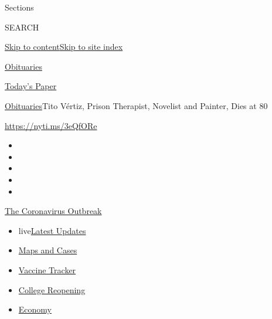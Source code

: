 Sections

SEARCH

\protect\hyperlink{site-content}{Skip to
content}\protect\hyperlink{site-index}{Skip to site index}

\href{https://www.nytimes.com/section/obituaries}{Obituaries}

\href{https://myaccount.nytimes.com/auth/login?response_type=cookie\&client_id=vi}{}

\href{https://www.nytimes.com/section/todayspaper}{Today's Paper}

\href{/section/obituaries}{Obituaries}\textbar{}Tito Vértiz, Prison
Therapist, Novelist and Painter, Dies at 80

\url{https://nyti.ms/3eQfORe}

\begin{itemize}
\item
\item
\item
\item
\item
\end{itemize}

\href{https://www.nytimes.com/news-event/coronavirus?action=click\&pgtype=Article\&state=default\&region=TOP_BANNER\&context=storylines_menu}{The
Coronavirus Outbreak}

\begin{itemize}
\tightlist
\item
  live\href{https://www.nytimes.com/2020/08/03/world/coronavirus-covid-19.html?action=click\&pgtype=Article\&state=default\&region=TOP_BANNER\&context=storylines_menu}{Latest
  Updates}
\item
  \href{https://www.nytimes.com/interactive/2020/us/coronavirus-us-cases.html?action=click\&pgtype=Article\&state=default\&region=TOP_BANNER\&context=storylines_menu}{Maps
  and Cases}
\item
  \href{https://www.nytimes.com/interactive/2020/science/coronavirus-vaccine-tracker.html?action=click\&pgtype=Article\&state=default\&region=TOP_BANNER\&context=storylines_menu}{Vaccine
  Tracker}
\item
  \href{https://www.nytimes.com/2020/08/02/us/covid-college-reopening.html?action=click\&pgtype=Article\&state=default\&region=TOP_BANNER\&context=storylines_menu}{College
  Reopening}
\item
  \href{https://www.nytimes.com/live/2020/08/03/business/stock-market-today-coronavirus?action=click\&pgtype=Article\&state=default\&region=TOP_BANNER\&context=storylines_menu}{Economy}
\end{itemize}

